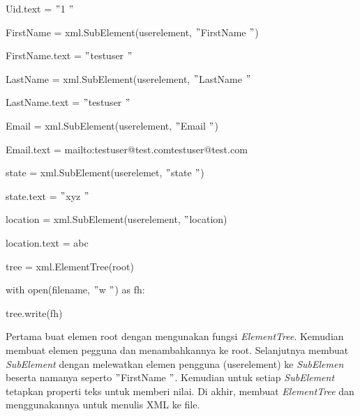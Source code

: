 \noindent 
{\fontsize{10pt}{10pt}\selectfont Uid.text =  $ " $1 $ " $} \par
\vspace{10pt}
\noindent 
{\fontsize{10pt}{10pt}\selectfont FirstName = xml.SubElement(userelement,  $ " $FirstName $ " $)} \par
\noindent 
{\fontsize{10pt}{10pt}\selectfont FirstName.text =  $ " $testuser $ " $} \par
\vspace{10pt}
\noindent 
{\fontsize{10pt}{10pt}\selectfont LastName = xml.SubElement(userelement,  $ " $LastName $ " $} \par
\noindent 
{\fontsize{10pt}{10pt}\selectfont LastName.text =  $ " $testuser $ " $} \par
\vspace{10pt}
\noindent 
{\fontsize{10pt}{10pt}\selectfont Email = xml.SubElement(userelement,  $ " $Email $ " $)} \par
\noindent 
{\fontsize{10pt}{10pt}\selectfont Email.text = {mailto:testuser@test.com}{testuser@test.com}
} \par
\vspace{10pt}
\noindent 
{\fontsize{10pt}{10pt}\selectfont state = xml.SubElement(userelemet,  $ " $state $ " $)} \par
\noindent 
{\fontsize{10pt}{10pt}\selectfont state.text =  $ " $xyz $ " $} \par
\vspace{10pt}
\noindent 
{\fontsize{10pt}{10pt}\selectfont location = xml.SubElement(userelement,  $ " $location)} \par
\noindent 
{\fontsize{10pt}{10pt}\selectfont location.text = abc} \par
\vspace{10pt}
\noindent 
{\fontsize{10pt}{10pt}\selectfont tree = xml.ElementTree(root)} \par
\noindent 
{\fontsize{10pt}{10pt}\selectfont with open(filename,  $ " $w $ " $) as fh:} \par
\noindent 
{\fontsize{10pt}{10pt}\selectfont tree.write(fh)} \par
\vspace{10pt}
\noindent 
 \hspace*{0.5in} Pertama buat elemen root dengan mengunakan fungsi \textit{ElementTree}. Kemudian membuat elemen pegguna dan menambahkannya ke root. Selanjutnya membuat \textit{SubElement }dengan melewatkan elemen pengguna (userelement) ke \textit{SubElemen} beserta namanya seperto  $ " $FirstName $ " $. Kemudian untuk setiap \textit{SubElement} tetapkan properti teks untuk memberi nilai. Di akhir, membuat \textit{ElementTree} dan menggunakannya untuk menulis XML ke file. \par
